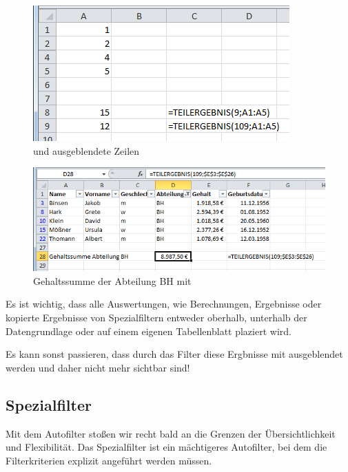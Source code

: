 \enlargethispage{1cm}
	\begin{figure}[H]
		\centering
			\includegraphics[scale=0.7]{images/teilergebnis}
		\caption{ und ausgeblendete Zeilen}
		\label{fig:teilergebnis}
	\end{figure}%
\vspace{-1em}
	\begin{figure}[H]
		\centering
			\includegraphics[scale=0.7]{images/teilergebnis-beispiel}
		\caption{Gehaltssumme der Abteilung BH mit  }
		\label{fig:teilergebnisbeispiel}
	\end{figure}

\begin{lightbulbbox}
Es ist wichtig, dass alle Auswertungen, wie Berechnungen, Ergebnisse oder kopierte Ergebnisse von Spezialfiltern entweder oberhalb, unterhalb der Datengrundlage oder auf einem eigenen Tabellenblatt plaziert wird.

Es kann sonst passieren, dass durch das Filter diese Ergbnisse mit ausgeblendet werden und daher nicht mehr sichtbar sind!

\end{lightbulbbox}

\subsection{Spezialfilter}
\enlargethispage{1cm}
Mit dem Autofilter stoßen wir recht bald an die Grenzen der Übersichtlichkeit und Flexibilität. Das Spezialfilter ist ein mächtigeres Autofilter, bei dem die Filterkriterien explizit angeführt werden müssen.


